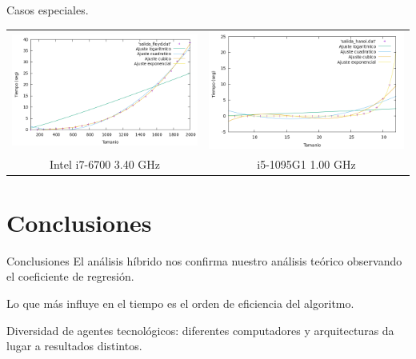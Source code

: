 \documentclass[10pt, xcolor=table]{beamer}
\begin{document}
\begin{frame}[fragile]{Casos especiales.
}
\centering
\begin{tabular}{cc}
\includegraphics[scale=0.2]{../../Images/floy_comparacion.png}
&
\includegraphics[scale=0.2]{../../Images/hanoi_comparacion.png}
\\
Intel i7-6700 3.40 GHz & i5-1095G1 1.00 GHz
\end{tabular}
\end{frame}

\section{Conclusiones}

\begin{frame}{Conclusiones}
El análisis híbrido nos confirma nuestro análisis teórico observando el coeficiente de regresión.

Lo que más influye en el tiempo es el orden de eficiencia del algoritmo.

Diversidad de agentes tecnológicos: diferentes computadores y arquitecturas da lugar a resultados distintos.
\end{frame}
\end{document}
